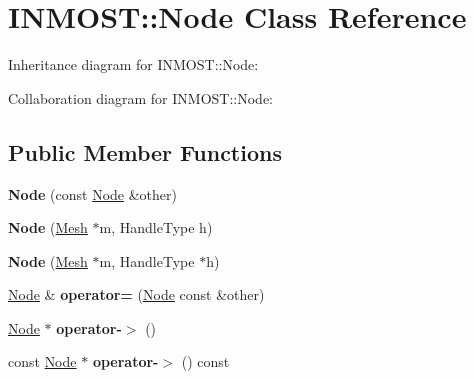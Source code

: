 \hypertarget{classINMOST_1_1Node}{\section{I\-N\-M\-O\-S\-T\-:\-:Node Class Reference}
\label{classINMOST_1_1Node}
}


Inheritance diagram for I\-N\-M\-O\-S\-T\-:\-:Node\-:


Collaboration diagram for I\-N\-M\-O\-S\-T\-:\-:Node\-:
\subsection*{Public Member Functions}
\begin{DoxyCompactItemize}
\item 
\hypertarget{classINMOST_1_1Node_a3fc491ada3dc479780d467ee6cdb80ab}{{\bfseries Node} (const \hyperlink{classINMOST_1_1Node}{Node} \&other)}\label{classINMOST_1_1Node_a3fc491ada3dc479780d467ee6cdb80ab}

\item 
\hypertarget{classINMOST_1_1Node_ac5ddbc31a3ec69a4bb950f62b72e880b}{{\bfseries Node} (\hyperlink{classINMOST_1_1Mesh}{Mesh} $\ast$m, Handle\-Type h)}\label{classINMOST_1_1Node_ac5ddbc31a3ec69a4bb950f62b72e880b}

\item 
\hypertarget{classINMOST_1_1Node_a9c2c4cafdf456a58d02dc58b914ae294}{{\bfseries Node} (\hyperlink{classINMOST_1_1Mesh}{Mesh} $\ast$m, Handle\-Type $\ast$h)}\label{classINMOST_1_1Node_a9c2c4cafdf456a58d02dc58b914ae294}

\item 
\hypertarget{classINMOST_1_1Node_a66f15cc56dd523d7e445bf2daa4619c3}{\hyperlink{classINMOST_1_1Node}{Node} \& {\bfseries operator=} (\hyperlink{classINMOST_1_1Node}{Node} const \&other)}\label{classINMOST_1_1Node_a66f15cc56dd523d7e445bf2daa4619c3}

\item 
\hypertarget{classINMOST_1_1Node_a8a795b182d86d10bf78589a200d38e93}{\hyperlink{classINMOST_1_1Node}{Node} $\ast$ {\bfseries operator-\/$>$} ()}\label{classINMOST_1_1Node_a8a795b182d86d10bf78589a200d38e93}

\item 
\hypertarget{classINMOST_1_1Node_aabde896f896f372a6c6c0076716bb599}{const \hyperlink{classINMOST_1_1Node}{Node} $\ast$ {\bfseries operator-\/$>$} () const }\label{classINMOST_1_1Node_aabde896f896f372a6c6c0076716bb599}


\end{DoxyCompactItemize}
